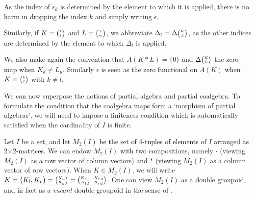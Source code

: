 \begin{Not}\label{NotCom} As the index of $\epsilon_k$ is determined by the element to which it is applied, there is no harm in dropping the index $k$ and simply writing $\epsilon$.

Similarly, if $K = {\tiny {\begin{pmatrix} k\\l\end{pmatrix}}}$ and $L = {\tiny {\begin{pmatrix} l\\m\end{pmatrix}}}$, we abbreviate $\Delta_l = \Delta{\tiny {\begin{pmatrix} K\\L\end{pmatrix}}}$, as the other indices are determined by the element to which $\Delta_l$ is applied.
\end{Not}

We also make again the convention that $A(K*L)=\{0\}$ and $\Delta{\tiny {\begin{pmatrix} K\\L\end{pmatrix}}}$ the zero map when $K_d \neq L_u$. Similarly $\epsilon$ is seen as the zero functional on $A(K)$ when $K={\tiny {\begin{pmatrix} k\\l\end{pmatrix}}}$ with $k\neq l$. 


We can now superpose the notions of partial algebra and partial coalgebra. To formulate the condition that the coalgebra maps form a `morphism of partial algebras', we will need to impose a finiteness condition which is automatically satisfied when the cardinality of $I$ is finite.

Let $I$ be a set, and let $M_2(I)$ be the set of 4-tuples of elements of $I$ arranged as 2$\times$2-matrices. We can endow $M_2(I)$ with two compositions, namely $\cdot$ (viewing $M_2(I)$ as a row vector of column vectors) and $*$ (viewing $M_2(I)$ as a column vector of row vectors). When $K\in M_2(I)$, we will write $K = {\begin{pmatrix} K_l, K_r\end{pmatrix}} = {\tiny {\begin{pmatrix} K_u\\K_d\end{pmatrix}}} = {{\tiny \begin{pmatrix} K_{lu} \quad K_{ru} \\ K_{ld} \quad K_{rd}\end{pmatrix}}}$. One can view $M_2(I)$ as a double groupoid, and in fact as a \emph{vacant} double groupoid in the sense of \cite{AN1}. %

